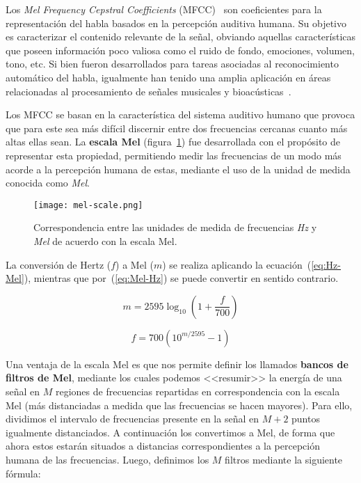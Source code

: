 Los \textit{Mel Frequency Cepstral Coefficients} (MFCC)~\cite{Davis80} son coeficientes para la representación del habla basados en la percepción auditiva humana.
Su objetivo es caracterizar el contenido relevante de la señal, obviando aquellas características que poseen información poco valiosa como el ruido de fondo, emociones, volumen, tono, etc.
Si bien fueron desarrollados para tareas asociadas al reconocimiento automático del habla, igualmente han tenido una amplia aplicación en áreas relacionadas al procesamiento de señales musicales y bioacústicas~\cite{McKinney03,Dufour14,Clemins05,Lee06,Li01,Cowling03,Mitrovic06}.

Los MFCC se basan en la característica del sistema auditivo humano que provoca que para este sea más difícil discernir entre dos frecuencias cercanas cuanto más altas ellas sean.
La \textbf{escala Mel} (figura~\ref{img:mel-scale}) fue desarrollada con el propósito de representar esta propiedad, permitiendo medir las frecuencias de un modo más acorde a la percepción humana de estas, mediante el uso de la unidad de medida conocida como \textit{Mel}.

\begin{figure}[!h]
    \centering
    \texttt{[image: mel-scale.png]}
    \caption{Correspondencia entre las unidades de medida de frecuencias \textit{Hz} y \textit{Mel} de acuerdo con la escala Mel.}
    \label{img:mel-scale}
\end{figure}

La conversión de Hertz ($f$) a Mel ($m$) se realiza aplicando la ecuación~(\ref{eq:Hz-Mel}), mientras que por~(\ref{eq:Mel-Hz}) se puede convertir en sentido contrario.

\begin{equation}
    \label{eq:Hz-Mel}
    m = 2595\log_{10}\left( 1 + \frac{f}{700} \right)
\end{equation}

\begin{equation}
    \label{eq:Mel-Hz}
    f = 700\left( 10^{m/2595} - 1 \right)
\end{equation}

Una ventaja de la escala Mel es que nos permite definir los llamados \textbf{bancos de filtros de Mel}, mediante los cuales podemos <<resumir>> la energía de una señal en $M$ regiones de frecuencias repartidas en correspondencia con la escala Mel (más distanciadas a medida que las frecuencias se hacen mayores).
Para ello, dividimos el intervalo de frecuencias presente en la señal en $M+2$ puntos igualmente distanciados.
A continuación los convertimos a Mel, de forma que ahora estos estarán situados a distancias correspondientes a la percepción humana de las frecuencias.
Luego, definimos los $M$ filtros mediante la siguiente fórmula:

